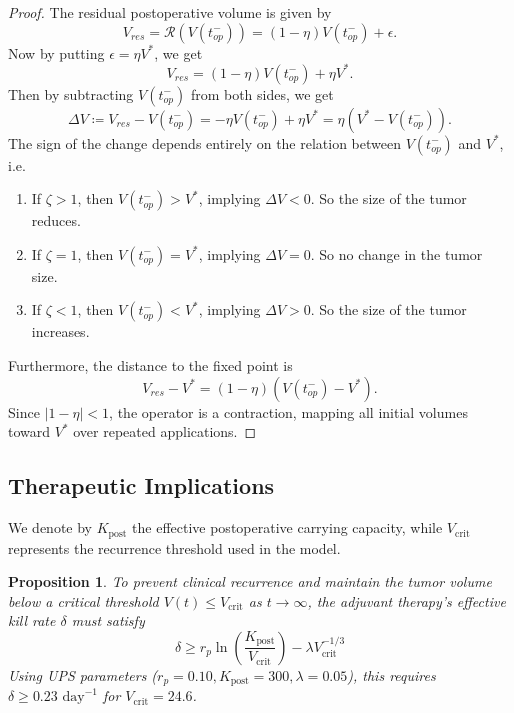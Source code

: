 \documentclass[11pt, reqno]{amsart}
\numberwithin{equation}{section}
\newtheorem{prop}{Proposition}
\theoremstyle{definition}
\begin{document}
\begin{proof}%
The residual postoperative volume is given by
\[
V_{res} = \mathcal R(V(t_{op}^-)) = (1-\eta)V(t_{op}^-)+\epsilon.
\]
Now by putting $\epsilon = \eta V^*$, we get
\[ V_{res} = (1-\eta)V(t_{op}^-) + \eta V^*. \]
Then by subtracting $V(t_{op}^-)$ from both sides, we get 
\[ \Delta V \coloneqq V_{res} - V(t_{op}^-) = -\eta V(t_{op}^-) + \eta V^* = \eta(V^* - V(t_{op}^-)). \]
The sign of the change depends entirely on the relation between $V(t_{op}^-)$ and $V^*$, i.e.
\begin{enumerate}
    \item[(i)] If $\zeta > 1$, then $V(t_{op}^-) > V^*$, implying $\Delta V < 0$. So the size of the tumor reduces.
    \vspace{0.15cm}
    
    \item[(ii)] If $\zeta = 1$, then $V(t_{op}^-) = V^*$, implying $\Delta V = 0$. So no change in the tumor size.
    \vspace{0.15cm}
    
    \item[(iii)] If $\zeta < 1$, then $V(t_{op}^-) < V^*$, implying $\Delta V > 0$. So the size of the tumor increases.
\end{enumerate}
Furthermore, the distance to the fixed point is $$V_{res} - V^* = (1-\eta)(V(t_{op}^-) - V^*).$$ Since $|1-\eta| < 1$, the operator is a contraction, mapping all initial volumes toward $V^*$ over repeated applications.
\end{proof}





\subsection{Therapeutic Implications}
\vspace{0.2cm}

We denote by $K_{\mathrm{post}}$ the effective postoperative carrying capacity, while $V_{\mathrm{crit}}$ represents the recurrence threshold used in the model.
\begin{prop}
\label{prop:adjuvant}
To prevent clinical recurrence and maintain the tumor volume below a critical threshold $V(t) \leq V_{\text{crit}}$ as $t \to \infty$, the adjuvant therapy's effective kill rate $\delta$ must satisfy
\begin{equation}
\delta \geq r_p \ln\left(\frac{K_{\text{post}}}{V_{\text{crit}}}\right) - \lambda V_{\text{crit}}^{-1/3}
\end{equation}
Using UPS parameters ($r_p = 0.10, K_{\text{post}}=300, \lambda=0.05$), this requires $\delta \geq 0.23 \text{ day}^{-1}$ for $V_{\text{crit}} = 24.6$.
\end{prop}
\end{document}
